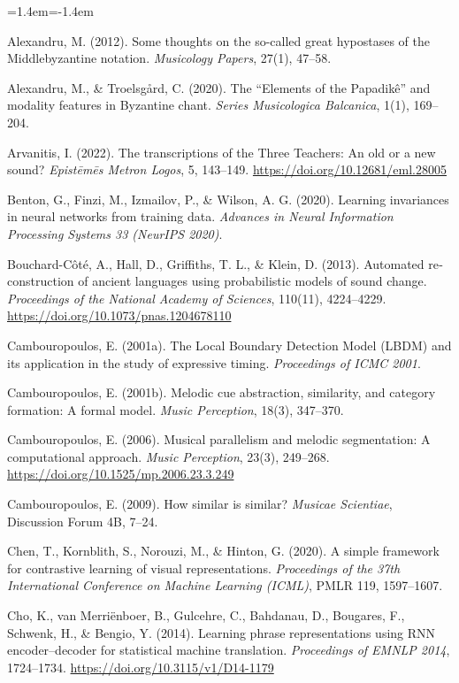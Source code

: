 \documentclass[11pt,a4paper]{article}
\newenvironment{reflist}{\begin{list}{}{\leftmargin=1.4em\itemindent=-1.4em\itemsep=0.8pt\parsep=0pt}\small}{\end{list}}
\begin{document}
\begin{otherlanguage}{english}
\begin{reflist}
\item Alexandru, M. (2012). Some thoughts on the so-called great hypostases of the Middlebyzantine notation. \emph{Musicology Papers}, 27(1), 47--58.
\item Alexandru, M., \& Troelsgård, C. (2020). The ``Elements of the Papadikê'' and modality features in Byzantine chant. \emph{Series Musicologica Balcanica}, 1(1), 169--204.
\item Arvanitis, I. (2022). The transcriptions of the Three Teachers: An old or a new sound? \emph{Epistēmēs Metron Logos}, 5, 143--149. \url{https://doi.org/10.12681/eml.28005}
\item Benton, G., Finzi, M., Izmailov, P., \& Wilson, A. G. (2020). Learning invariances in neural networks from training data. \emph{Advances in Neural Information Processing Systems 33 (NeurIPS 2020)}.
\item Bouchard-Côté, A., Hall, D., Griffiths, T. L., \& Klein, D. (2013). Automated reconstruction of ancient languages using probabilistic models of sound change. \emph{Proceedings of the National Academy of Sciences}, 110(11), 4224--4229. \url{https://doi.org/10.1073/pnas.1204678110}
\item Cambouropoulos, E. (2001a). The Local Boundary Detection Model (LBDM) and its application in the study of expressive timing. \emph{Proceedings of ICMC 2001}.
\item Cambouropoulos, E. (2001b). Melodic cue abstraction, similarity, and category formation: A formal model. \emph{Music Perception}, 18(3), 347--370.
\item Cambouropoulos, E. (2006). Musical parallelism and melodic segmentation: A computational approach. \emph{Music Perception}, 23(3), 249--268. \url{https://doi.org/10.1525/mp.2006.23.3.249}
\item Cambouropoulos, E. (2009). How similar is similar? \emph{Musicae Scientiae}, Discussion Forum 4B, 7--24.
\item Chen, T., Kornblith, S., Norouzi, M., \& Hinton, G. (2020). A simple framework for contrastive learning of visual representations. \emph{Proceedings of the 37th International Conference on Machine Learning (ICML)}, PMLR 119, 1597--1607.
\item Cho, K., van Merriënboer, B., Gulcehre, C., Bahdanau, D., Bougares, F., Schwenk, H., \& Bengio, Y. (2014). Learning phrase representations using RNN encoder--decoder for statistical machine translation. \emph{Proceedings of EMNLP 2014}, 1724--1734. \url{https://doi.org/10.3115/v1/D14-1179}

\end{reflist}
\end{otherlanguage}
\end{document}
